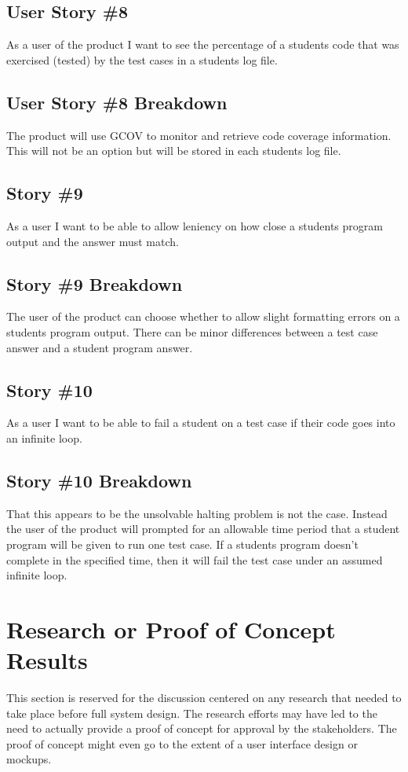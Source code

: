 \subsection{User Story \#8}
As a user of the product I want to see the percentage of a students code that was exercised (tested) by the test cases in a students log file.

\subsection{User Story \#8 Breakdown}
The product will use GCOV to monitor and retrieve code coverage information. This will not be an option but will be stored in each students log file.

\subsection{Story \#9}
As a user I want to be able to allow leniency on how close a students program output and the answer must match.

\subsection{Story \#9 Breakdown}
The user of the product can choose whether to allow slight formatting errors on a students program output. There can be minor differences between a test case answer and a student program answer.

\subsection{Story \#10}
As a user I want to be able to fail a student on a test case if their code goes into an infinite loop.

\subsection{Story \#10 Breakdown}
That this appears to be the unsolvable halting problem is not the case. Instead the user of the product will prompted for an allowable time period that a student program will be given to run one test case. If a students program doesn't complete in the specified time, then it will fail the test case under an assumed infinite loop.

\section{Research or Proof of Concept Results}
This section is reserved for the discussion centered on any research that needed 
to take place before full system design.  The research efforts may have led to 
the need to actually provide a proof of concept for approval by the stakeholders. 
 The proof of concept might even go to the extent of a user interface design or 
mockups.


